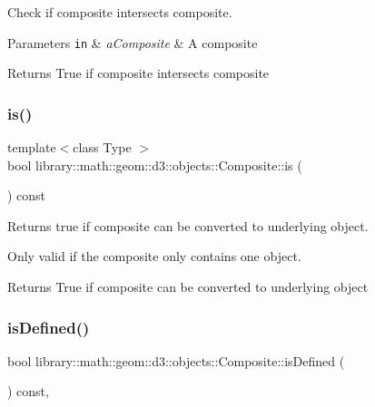 Check if composite intersects composite. 


\begin{DoxyParams}[1]{Parameters}
\mbox{\tt in}  & {\em a\+Composite} & A composite \\
\hline
\end{DoxyParams}
\begin{DoxyReturn}{Returns}
True if composite intersects composite 
\end{DoxyReturn}
\mbox{\label{classlibrary_1_1math_1_1geom_1_1d3_1_1objects_1_1_composite_a93c70465b6f063fa98b7a99c22f380e7}} 
\subsubsection{\texorpdfstring{is()}{is()}}
{\footnotesize\ttfamily template$<$class Type $>$ \\
bool library\+::math\+::geom\+::d3\+::objects\+::\+Composite\+::is (\begin{DoxyParamCaption}{ }\end{DoxyParamCaption}) const\hspace{0.3cm}{\ttfamily [inline]}}



Returns true if composite can be converted to underlying object. 

Only valid if the composite only contains one object.

\begin{DoxyReturn}{Returns}
True if composite can be converted to underlying object 
\end{DoxyReturn}
\mbox{\label{classlibrary_1_1math_1_1geom_1_1d3_1_1objects_1_1_composite_a6bc08a1686be837f6f8101a285d7351b}} 
\subsubsection{\texorpdfstring{is\+Defined()}{isDefined()}}
{\footnotesize\ttfamily bool library\+::math\+::geom\+::d3\+::objects\+::\+Composite\+::is\+Defined (\begin{DoxyParamCaption}{ }\end{DoxyParamCaption}) const\hspace{0.3cm}{\ttfamily [override]}, {\ttfamily [virtual]}}



